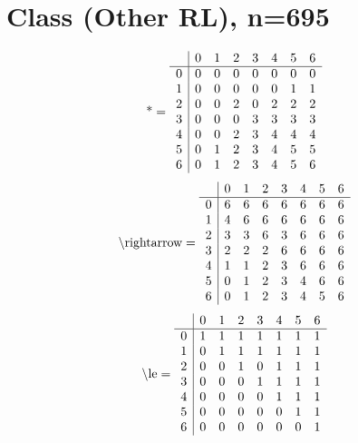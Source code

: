 \documentclass[11pt]{article}
\begin{document}
\section{Class (Other RL), n=695}
\[\text{*} = 
\begin{array}{r | r r r r r r r}
 & 0 & 1 & 2 & 3 & 4 & 5 & 6 \\ \hline
0 & 0 & 0 & 0 & 0 & 0 & 0 & 0 \\
1 & 0 & 0 & 0 & 0 & 0 & 1 & 1 \\
2 & 0 & 0 & 2 & 0 & 2 & 2 & 2 \\
3 & 0 & 0 & 0 & 3 & 3 & 3 & 3 \\
4 & 0 & 0 & 2 & 3 & 4 & 4 & 4 \\
5 & 0 & 1 & 2 & 3 & 4 & 5 & 5 \\
6 & 0 & 1 & 2 & 3 & 4 & 5 & 6 \\
\end{array}
\]
\[\text{\textbackslash rightarrow} = 
\begin{array}{r | r r r r r r r}
 & 0 & 1 & 2 & 3 & 4 & 5 & 6 \\ \hline
0 & 6 & 6 & 6 & 6 & 6 & 6 & 6 \\
1 & 4 & 6 & 6 & 6 & 6 & 6 & 6 \\
2 & 3 & 3 & 6 & 3 & 6 & 6 & 6 \\
3 & 2 & 2 & 2 & 6 & 6 & 6 & 6 \\
4 & 1 & 1 & 2 & 3 & 6 & 6 & 6 \\
5 & 0 & 1 & 2 & 3 & 4 & 6 & 6 \\
6 & 0 & 1 & 2 & 3 & 4 & 5 & 6 \\
\end{array}
\]
\[\text{\textbackslash le} = 
\begin{array}{r | r r r r r r r}
 & 0 & 1 & 2 & 3 & 4 & 5 & 6 \\ \hline
0 & 1 & 1 & 1 & 1 & 1 & 1 & 1 \\
1 & 0 & 1 & 1 & 1 & 1 & 1 & 1 \\
2 & 0 & 0 & 1 & 0 & 1 & 1 & 1 \\
3 & 0 & 0 & 0 & 1 & 1 & 1 & 1 \\
4 & 0 & 0 & 0 & 0 & 1 & 1 & 1 \\
5 & 0 & 0 & 0 & 0 & 0 & 1 & 1 \\
6 & 0 & 0 & 0 & 0 & 0 & 0 & 1 \\
\end{array}
\]
\end{document}
